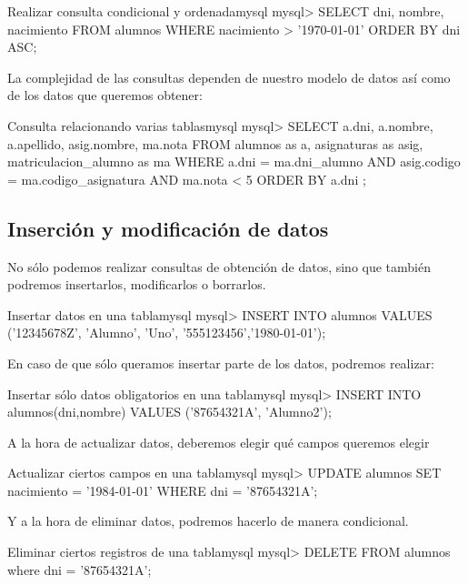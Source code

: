 \begin{mycode}{Realizar consulta condicional y ordenada}{mysql}{}
mysql> SELECT dni, nombre, nacimiento
            FROM alumnos
            WHERE nacimiento > '1970-01-01'
            ORDER BY dni ASC;
\end{mycode}


La complejidad de las consultas dependen de nuestro modelo de datos así como de los datos que queremos obtener:

\begin{mycode}{Consulta relacionando varias tablas}{mysql}{{\small }}
mysql> SELECT a.dni, a.nombre, a.apellido, asig.nombre, ma.nota
            FROM alumnos as a, asignaturas as asig, matriculacion_alumno as ma
            WHERE a.dni = ma.dni_alumno
                AND asig.codigo = ma.codigo_asignatura
                AND ma.nota < 5
            ORDER BY a.dni ;
\end{mycode}


\subsection{Inserción y modificación de datos}
No sólo podemos realizar consultas de obtención de datos, sino que también podremos insertarlos, modificarlos o borrarlos.

\begin{mycode}{Insertar datos en una tabla}{mysql}{\scriptsize}
mysql> INSERT INTO alumnos VALUES ('12345678Z', 'Alumno', 'Uno', '555123456','1980-01-01');
\end{mycode}

En caso de que sólo queramos insertar parte de los datos, podremos realizar:

\begin{mycode}{Insertar sólo datos obligatorios en una tabla}{mysql}{}
mysql> INSERT INTO alumnos(dni,nombre) VALUES ('87654321A', 'Alumno2');
\end{mycode}

A la hora de actualizar datos, deberemos elegir qué campos queremos elegir

\begin{mycode}{Actualizar ciertos campos en una tabla}{mysql}{\small}
mysql> UPDATE alumnos SET nacimiento = '1984-01-01' WHERE dni = '87654321A';
\end{mycode}

Y a la hora de eliminar datos, podremos hacerlo de manera condicional.

\begin{mycode}{Eliminar ciertos registros de una tabla}{mysql}{}
mysql> DELETE FROM alumnos where dni = '87654321A';
\end{mycode}

